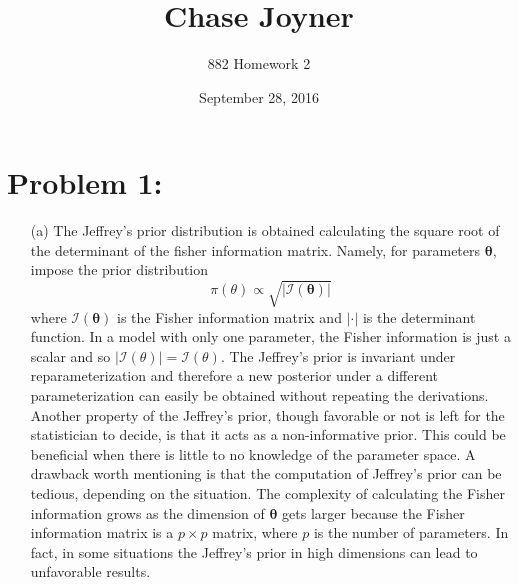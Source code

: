 \documentclass[11pt]{article}
\title{Chase Joyner}
\author{882 Homework 2}
\date{September 28, 2016}
\begin{document}
\maketitle

\section*{Problem 1:}
\begin{itemize}
\item[(a)]  The Jeffrey's prior distribution is obtained calculating the square root of the determinant of the fisher information matrix.  Namely, for parameters $\boldsymbol\theta$, impose the prior distribution
\[
\pi(\theta) \propto \sqrt{|\mathcal{I}(\boldsymbol\theta)|}
\]
where $\mathcal{I}(\boldsymbol\theta)$ is the Fisher information matrix and $|\cdot|$ is the determinant function.  In a model with only one parameter, the Fisher information is just a scalar and so $|\mathcal{I}(\theta)| = \mathcal{I}(\theta)$.  The Jeffrey's prior is invariant under reparameterization and therefore a new posterior under a different parameterization can easily be obtained without repeating the derivations.  Another property of the Jeffrey's prior, though favorable or not is left for the statistician to decide, is that it acts as a non-informative prior.  This could be beneficial when there is little to no knowledge of the parameter space.  A drawback worth mentioning is that the computation of Jeffrey's prior can be tedious, depending on the situation.  The complexity of calculating the Fisher information grows as the dimension of $\boldsymbol\theta$ gets larger because the Fisher information matrix is a $p\times p$ matrix, where $p$ is the number of parameters.  In fact, in some situations the Jeffrey's prior in high dimensions can lead to unfavorable results.


\end{itemize}
\end{document}
